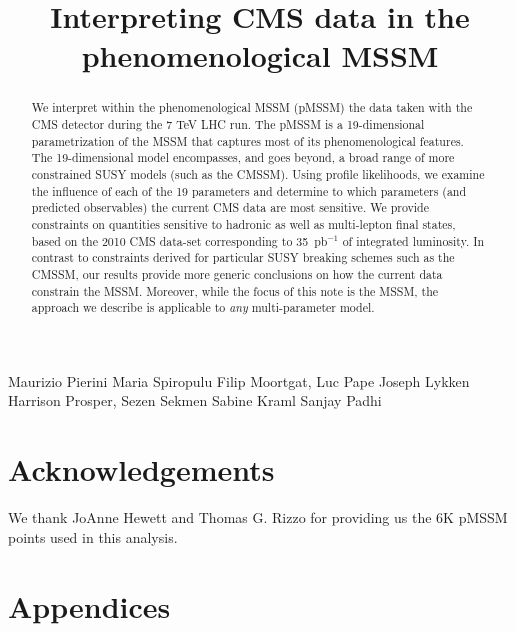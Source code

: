 \documentclass{cmspaper}
\begin{document}
%
\begin{titlepage}
\title{Interpreting CMS data in the phenomenological MSSM}

  \begin{Authlist}
    Maurizio Pierini
    Maria Spiropulu
    Filip Moortgat, Luc Pape
    Joseph Lykken
    Harrison Prosper, Sezen Sekmen
    Sabine Kraml
    Sanjay Padhi
    
  \end{Authlist}

\begin{abstract}
We interpret within the phenomenological MSSM (pMSSM) the data taken with the CMS detector during the 7 TeV LHC run.  
The pMSSM is a 19-dimensional parametrization of the MSSM that captures most of 
its phenomenological features. The 19-dimensional model
encompasses, and goes beyond, a broad range of more constrained SUSY models (such as the CMSSM). 
Using profile likelihoods, we examine the influence of each of the 
19 parameters and determine to which parameters 
(and predicted observables) the current CMS data are most sensitive. 
We provide constraints on quantities sensitive to hadronic as well as multi-lepton final states, 
based on the 2010 CMS data-set corresponding to 35~pb$^{-1}$ of integrated luminosity.
In contrast to constraints derived for particular SUSY breaking schemes 
such as the CMSSM, our results provide more generic conclusions on how the current 
data constrain the MSSM. 
Moreover, while the focus of this note is the 
MSSM, the approach we describe is applicable to \emph{any} multi-parameter model.
\end{abstract}
\end{titlepage}




%




\section*{Acknowledgements}

We thank JoAnne Hewett and Thomas G. Rizzo for providing us the 6K pMSSM points used in this analysis.

\clearpage



%
%
\clearpage


\clearpage
\appendices
\section*{Appendices}

\clearpage

\end{document}
